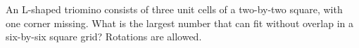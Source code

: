 An L-shaped triomino consists of three unit cells of a two-by-two square, with one corner missing. What is the largest number that can fit without overlap in a six-by-six square grid? Rotations are allowed.
